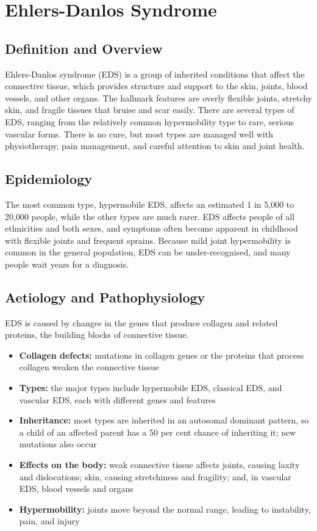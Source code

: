 \chapter{Ehlers-Danlos Syndrome}

\section*{Definition and Overview}
Ehlers-Danlos syndrome (EDS) is a group of inherited conditions that affect the connective tissue, which provides structure and support to the skin, joints, blood vessels, and other organs. The hallmark features are overly flexible joints, stretchy skin, and fragile tissues that bruise and scar easily. There are several types of EDS, ranging from the relatively common hypermobility type to rare, serious vascular forms. There is no cure, but most types are managed well with physiotherapy, pain management, and careful attention to skin and joint health.

\section*{Epidemiology}
The most common type, hypermobile EDS, affects an estimated 1 in 5,000 to 20,000 people, while the other types are much rarer. EDS affects people of all ethnicities and both sexes, and symptoms often become apparent in childhood with flexible joints and frequent sprains. Because mild joint hypermobility is common in the general population, EDS can be under-recognised, and many people wait years for a diagnosis.

\section*{Aetiology and Pathophysiology}
EDS is caused by changes in the genes that produce collagen and related proteins, the building blocks of connective tissue.
\begin{itemize}
    \item \textbf{Collagen defects:} mutations in collagen genes or the proteins that process collagen weaken the connective tissue
    \item \textbf{Types:} the major types include hypermobile EDS, classical EDS, and vascular EDS, each with different genes and features
    \item \textbf{Inheritance:} most types are inherited in an autosomal dominant pattern, so a child of an affected parent has a 50 per cent chance of inheriting it; new mutations also occur
    \item \textbf{Effects on the body:} weak connective tissue affects joints, causing laxity and dislocations; skin, causing stretchiness and fragility; and, in vascular EDS, blood vessels and organs
    \item \textbf{Hypermobility:} joints move beyond the normal range, leading to instability, pain, and injury
\end{itemize}

